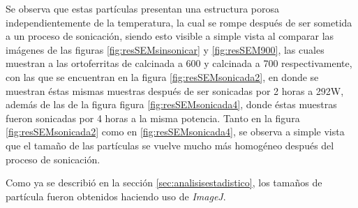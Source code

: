 \documentclass[../main.tex]{subfiles}
\begin{document}
Se observa que estas partículas presentan una estructura porosa independientemente de la temperatura, la cual se rompe después de ser sometida a un proceso de sonicación, siendo esto visible a simple vista al comparar las imágenes de las figuras \ref{fig:resSEMsinsonicar} y \ref{fig:resSEM900}, las cuales muestran a las ortoferritas de \neod{} calcinada a 600\gradoC{} y \sama{} calcinada a 700\gradoC{} respectivamente, con las que se encuentran en la figura \ref{fig:resSEMsonicada2}, en donde se muestran éstas mismas muestras después de ser sonicadas por 2 horas a 292W, además de las de la figura figura \ref{fig:resSEMsonicada4}, donde éstas muestras fueron sonicadas por 4 horas a la misma potencia. Tanto en la figura \ref{fig:resSEMsonicada2} como en \ref{fig:resSEMsonicada4}, se observa a simple vista que el tamaño de las partículas se vuelve mucho más homogéneo después del proceso de sonicación.

Como ya se describió en la sección \ref{sec:analisisestadistico}, los tamaños de partícula fueron obtenidos haciendo uso de \textit{ImageJ}.
\end{document}
